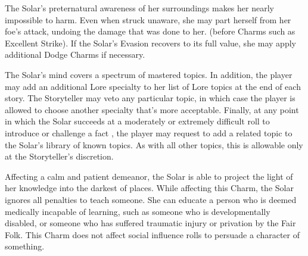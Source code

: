 
The Solar's preternatural awareness of her surroundings makes her nearly
impossible to harm. Even when struck unaware, she may part herself from
her foe's attack, undoing the damage that was done to her. 
(before Charms such as Excellent Strike). If the Solar's Evasion recovers to
its full value, she may apply additional Dodge Charms if necessary.





The Solar's mind covers a spectrum of mastered topics.  In addition, the player may add an additional Lore
specialty to her list of Lore topics at the end of each story. The Storyteller
may veto any particular topic, in which case the player is allowed to choose
another specialty that's more acceptable. Finally, at any point in which the
Solar succeeds at a moderately or extremely difficult roll to introduce or
challenge a fact \parencite*[p.~237]{ex3}, the player may request to add a
related topic to the Solar's library of known topics. As with all other topics,
this is allowable only at the Storyteller's discretion.



Affecting a calm and patient demeanor, the Solar is able to project the light
of her knowledge into the darkest of places. While affecting this Charm, the
Solar ignores all penalties to teach someone. She can educate a person who is
deemed medically incapable of learning, such as someone who is developmentally
disabled, or someone who has suffered traumatic injury or privation by the Fair
Folk. This Charm does not affect social influence rolls to persuade a character
of something.


